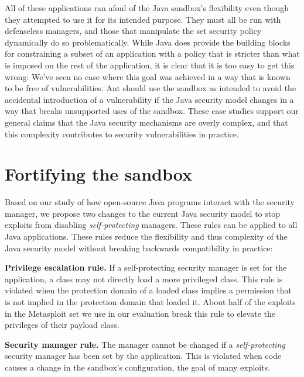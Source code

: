 \documentclass{sig-alternate}
\begin{document}
All of these applications ran afoul of the Java sandbox's flexibility even
though they attempted to use it for its intended purpose. 
They must all be run with defenseless managers, and those that 
manipulate the set security policy dynamically do so problematically.  
While Java does provide the
building blocks for constraining a subset of an application with a policy that
is stricter than what is imposed on the rest of the application, it is clear
that it is too easy to get this wrong:  We've seen no case where this goal was
achieved in a way that is known to be free of vulnerabilities. Ant should use the sandbox as intended to avoid the accidental introduction of a vulnerability if the Java security model changes in a way that breaks unsupported uses of the sandbox. These case
studies support our general claims that the Java security mechanisms are overly
complex, and that this complexity contributes to security vulnerabilities in
practice.  

\section{Fortifying the sandbox}\label{sec:Rules-for-Fortifying}

Based on our study of how open-source Java programs interact with the security
manager, we propose two changes to the current Java security model to stop exploits
from disabling \emph{self-protecting} managers.  These rules can be applied
to all Java applications.
These rules reduce the flexibility and thus complexity of the
Java security model without breaking backwards compatibility in practice:

\noindent\textbf{Privilege escalation rule.} If a self-protecting
security manager is set for the application, a class may not directly
load a more privileged class. This rule is violated when the protection
domain of a loaded class implies a permission that is not implied
in the protection domain that loaded it. About half of the exploits in the Metasploit set we use in our evaluation
break this rule to elevate the privileges of their payload
class.

\noindent \textbf{Security manager rule.} The manager cannot
be changed if a \emph{self-protecting} security manager has been set
by the application. This is violated when code causes a change
in the sandbox's configuration, the goal of many exploits.
\end{document}
